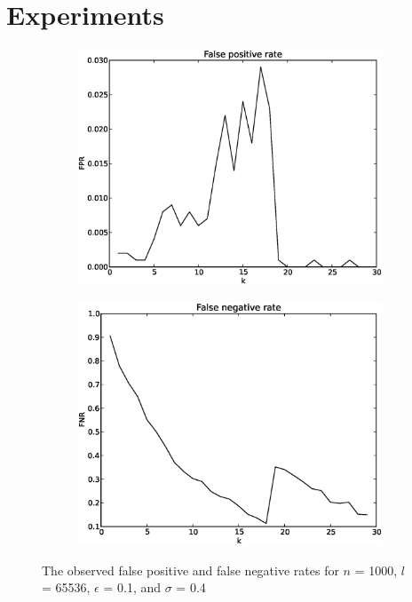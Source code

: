\documentclass[a4paper,11pt]{article}
\begin{document}
\section{Experiments}
\begin{figure}[H]
\centering
\begin{subfigure}{.5\textwidth}
  \centering
  \includegraphics[width=.95\linewidth]{FPR1}
\end{subfigure}%
\begin{subfigure}{.5\textwidth}
  \centering
  \includegraphics[width=.95\linewidth]{FNR1}
\end{subfigure}
\caption{The observed false positive and false negative rates for $n$ = 1000, $l$ = 65536, $\epsilon$ = 0.1, and $\sigma$ = 0.4}
\label{fig:n1000}
\end{figure}
\end{document}

